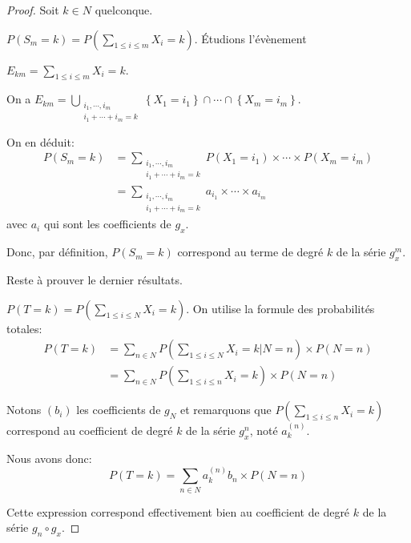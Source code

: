 \begin{proof}
Soit $k \in N$ quelconque.

$P\left(S_m = k\right) = P\left(\displaystyle{\sum \limits_{1 \leq i \leq m}} X_i = k\right)$. Étudions l'évènement

$E_{km} = \displaystyle{\sum \limits_{1 \leq i \leq m}} X_i = k$. 

On a $E_{km} = \bigcup \limits_{\substack{i_1, \cdots,i_m\\
i_1 + \cdots + i_m = k}} \left\{X_1 = i_1 \right \} \cap \cdots \cap \left\{X_m = i_m \right \}$.

On en déduit:
\begin{align*}
P\left(S_m = k\right) & = \displaystyle{\sum \limits_{\substack{i_1, \cdots,i_m\\
i_1 + \cdots + i_m = k}}} P(X_1 = i_1) \times \cdots \times P(X_m = i_m) \\
 & = \displaystyle{\sum \limits_{\substack{i_1, \cdots,i_m\\
i_1 + \cdots + i_m = k}}} a_{i_1} \times \cdots \times a_{i_m}
\end{align*}
avec $a_i$ qui sont les coefficients de $g_x$.

Donc, par définition, $P(S_m=k)$ correspond au terme de degré $k$ de la série $g_x^m$.

Reste à prouver le dernier résultats.

$P(T=k) = P\left(\displaystyle{\sum \limits_{1 \leq i \leq N}} X_i = k\right)$. On utilise la formule des probabilités totales:
\begin{align*}
P(T=k) & = \displaystyle{\sum \limits_{n \in N}} P\left(\displaystyle{\sum \limits_{1 \leq i \leq N}} X_i = k | N=n\right) \times P(N=n) \\
 & = \displaystyle{\sum \limits_{n \in N}} P\left(\displaystyle{\sum \limits_{1 \leq i \leq n}} X_i = k\right) \times P(N=n)
\end{align*}

Notons $\left(b_i\right)$ les coefficients de $g_N$ et remarquons que $P\left(\displaystyle{\sum \limits_{1 \leq i \leq n}} X_i = k\right)$ correspond au coefficient de degré $k$ de la série $g_x^n$, noté $a_k^{(n)}$.

Nous avons donc:
\[
P(T=k) = \displaystyle{\sum \limits_{n \in N}} a_k^{(n)}b_n \times P(N=n)
\]

Cette expression correspond effectivement bien au coefficient de degré $k$ de la série $g_n \circ g_x$.
\end{proof}


